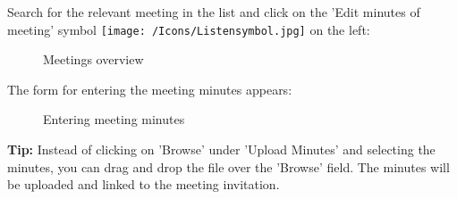 \vspace{6.5cm} 

Search for the relevant meeting in the list and click on the 'Edit minutes of meeting' symbol \texttt{[image: /Icons/Listensymbol.jpg]}  on the left:

\begin{figure}[H]
\caption{Meetings overview}
\end{figure}

\vspace{\baselineskip}

The form for entering the meeting minutes appears:

\begin{figure}[H]
\caption{Entering meeting minutes}
\end{figure}

\textbf{Tip:} Instead of clicking on 'Browse' under 'Upload Minutes' and selecting the minutes, you can drag and drop the file over the 'Browse' field. The minutes will be uploaded and linked to the meeting invitation.

\vspace{\baselineskip}

